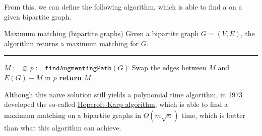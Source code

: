 \documentclass[a4paper, 12pt]{report}
\begin{document}
    From this, we can define the following algorithm, which is able to find a  on a given bipartite graph.

    \begin{framedalgo}[label={alg:max_matching_bip}]{Maximum matching (bipartite graphs)}
        Given a bipartite graph $G = (V, E)$, the algorithm returns a maximum matching for $G$. \\
        \hrule

        \quad
        \begin{algorithmic}[1]
                \State $M := \varnothing$
                \Do
                    \State $p := \texttt{findAugmentingPath}(G)$ 
                    \State Swap the edges between $M$ and $E(G) - M$ in $p$
                \State \textbf{return} $M$
            \EndFunction
        \end{algorithmic}
    \end{framedalgo}



    Although this naïve solution still yields a polynomial time algorithm, in 1973 \textcite{hopcroft} developed the so-called \href{https://en.wikipedia.org/wiki/Hopcroft%E2%80%93Karp_algorithm}{Hopcroft-Karp algorithm}, which is able to find a maximum matching on a bipartite graphs in $O(m \sqrt n)$ time, which is better than what this algorithm can achieve.
\end{document}
